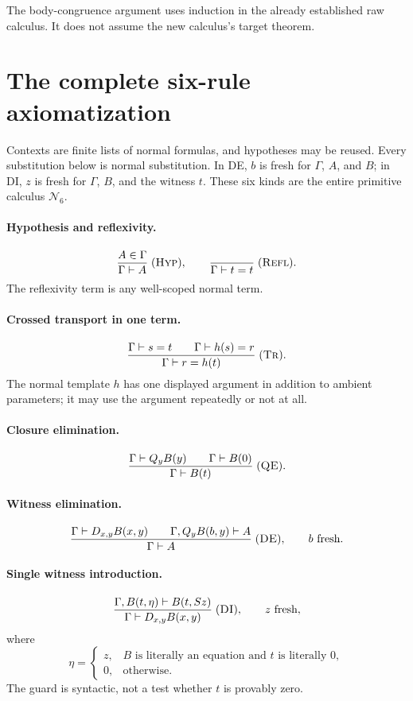 \documentclass[11pt]{article}
\theoremstyle{definition}
\newcommand{\Six}{\ensuremath{\mathcal N_6}}
\newcommand{\rulename}[1]{\textup{\textsc{#1}}}
\begin{document}
The body-congruence argument uses induction in the already established
raw calculus. It does not assume the new calculus's target theorem.

\section{The complete six-rule axiomatization}
\label{sec:rules}

Contexts are finite lists of normal formulas, and hypotheses may be
reused. Every substitution below is normal substitution. In
\rulename{DE}, $b$ is fresh for $\Gamma$, $A$, and $B$; in
\rulename{DI}, $z$ is fresh for $\Gamma$, $B$, and the witness $t$. These
six kinds are the entire primitive calculus \Six.

\paragraph{Hypothesis and reflexivity.}
\[
 \frac{A\in\Gamma}{\Gamma\vdash A}\;(\rulename{Hyp}),
 \qquad
 \frac{}{\Gamma\vdash t=t}\;(\rulename{Refl}).
\]
The reflexivity term is any well-scoped normal term.

\paragraph{Crossed transport in one term.}
\[
 \frac{\Gamma\vdash s=t\qquad\Gamma\vdash h(s)=r}
      {\Gamma\vdash r=h(t)}\;(\rulename{Tr}).
\]
The normal template $h$ has one displayed argument in addition to
ambient parameters; it may use the argument repeatedly or not at all.

\paragraph{Closure elimination.}
\[
 \frac{\Gamma\vdash Q_yB(y)\qquad\Gamma\vdash B(0)}
      {\Gamma\vdash B(t)}\;(\rulename{QE}).
\]

\paragraph{Witness elimination.}
\[
 \frac{\Gamma\vdash D_{x,y}B(x,y)
       \qquad\Gamma,Q_yB(b,y)\vdash A}
      {\Gamma\vdash A}\;(\rulename{DE}),\qquad b\text{ fresh}.
\]

\paragraph{Single witness introduction.}
\[
 \frac{\Gamma,B(t,\eta)\vdash B(t,Sz)}
      {\Gamma\vdash D_{x,y}B(x,y)}\;(\rulename{DI}),\qquad z\text{ fresh},
\]
where
\[
 \eta=
 \begin{cases}
 z,& B\text{ is literally an equation and }t\text{ is literally }0,\\
 0,&\text{otherwise}.
 \end{cases}
\]
The guard is syntactic, not a test whether $t$ is provably zero.
\end{document}
